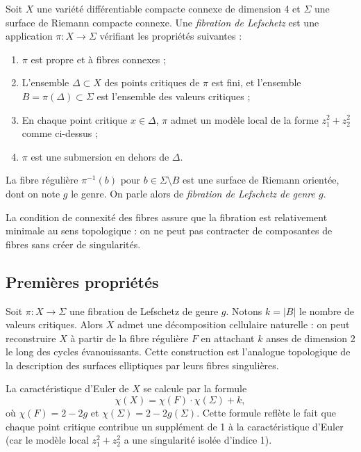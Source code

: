 \begin{definition}
Soit $X$ une variété différentiable compacte connexe de dimension 4 et $\Sigma$ une surface de Riemann compacte connexe. Une \emph{fibration de Lefschetz} est une application $\pi: X \to \Sigma$ vérifiant les propriétés suivantes :
\begin{enumerate}
\item $\pi$ est propre et à fibres connexes ;
\item L'ensemble $\Delta \subset X$ des points critiques de $\pi$ est fini, et l'ensemble $B = \pi(\Delta) \subset \Sigma$ est l'ensemble des valeurs critiques ;
\item En chaque point critique $x \in \Delta$, $\pi$ admet un modèle local de la forme $z_1^2 + z_2^2$ comme ci-dessus ;
\item $\pi$ est une submersion en dehors de $\Delta$.
\end{enumerate}
La fibre régulière $\pi^{-1}(b)$ pour $b \in \Sigma \setminus B$ est une surface de Riemann orientée, dont on note $g$ le genre. On parle alors de \emph{fibration de Lefschetz de genre $g$}.
\end{definition}

\begin{remarque}
La condition de connexité des fibres assure que la fibration est relativement minimale au sens topologique : on ne peut pas contracter de composantes de fibres sans créer de singularités.
\end{remarque}

\subsection{Premières propriétés}

Soit $\pi: X \to \Sigma$ une fibration de Lefschetz de genre $g$. Notons $k = |B|$ le nombre de valeurs critiques. Alors $X$ admet une décomposition cellulaire naturelle : on peut reconstruire $X$ à partir de la fibre régulière $F$ en attachant $k$ anses de dimension 2 le long des cycles évanouissants. Cette construction est l'analogue topologique de la description des surfaces elliptiques par leurs fibres singulières.

La caractéristique d'Euler de $X$ se calcule par la formule
\[
\chi(X) = \chi(F) \cdot \chi(\Sigma) + k,
\]
où $\chi(F) = 2-2g$ et $\chi(\Sigma) = 2-2g(\Sigma)$. Cette formule reflète le fait que chaque point critique contribue un supplément de 1 à la caractéristique d'Euler (car le modèle local $z_1^2+z_2^2$ a une singularité isolée d'indice 1).

